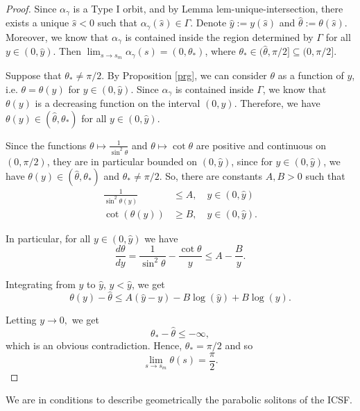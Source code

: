 \documentclass[12pt]{amsart}
\theoremstyle{plain}
\theoremstyle{definition}
\begin{document}
\begin{proof}
    Since $\alpha_\gamma$ is a Type I orbit, and by Lemma {lem-unique-intersection}, there exists a unique $\hat{s} < 0$ such that $\alpha_\gamma(\hat{s}) \in \Gamma$. Denote $\hat{y} := y(\hat{s})$ and $\hat{\theta} := \theta(\hat{s})$. Moreover, we know that  $\alpha_\gamma$ is contained inside the region determined by $\Gamma$ for all $y \in (0, \hat{y})$. Then $\lim_{s \to s_m} \alpha_\gamma(s) = (0, \theta_\ast)$, where $\theta_\ast \in (\hat{\theta}, \pi / 2] \subseteq (0, \pi/2]$.

    Suppose that $\theta_\ast \neq \pi / 2$. By Proposition \ref{prg}, we  can consider $\theta$ as a function of $y$, i.e. $\theta = \theta(y)$ for $y \in (0, \hat{y})$. Since $\alpha_\gamma$ is contained inside $\Gamma$, we know that $\theta(y)$ is a decreasing function on the interval $(0, \hat{y})$. Therefore, we have $\theta(y) \in (\hat{\theta}, \theta_\ast)$ for all $y \in (0,\hat{y})$.

    Since the functions $\theta \mapsto \frac{1}{\sin^2 \theta}$ and $\theta \mapsto \cot\theta$ are positive and continuous on $(0, \pi/2)$, they are in particular bounded on $(0,\hat{y})$, since for $y \in (0, \hat{y})$, we have $\theta(y) \in (\hat{\theta}, \theta_\ast)$ and $\theta_\ast \neq \pi / 2$. So, there are constants $A,B > 0$ such that
    \begin{equation*}
       	\begin{split}
	    \frac{1}{\sin^2 \theta(y)} &\leq A, \quad  y \in (0, \hat{y}) \\
	    \cot(\theta(y)) &\geq B, \quad  y \in (0, \hat{y}).
       	\end{split}
    \end{equation*}

    In particular, for all $y \in (0, \hat{y})$ we have
    $$\frac{d\theta}{dy} = \frac{1}{\sin^2\theta} - \frac{\cot\theta}{y} \leq A - \frac{B}{y}.$$

    Integrating from $y$ to $\hat{y}$, $y < \hat{y}$, we get
    $$\theta(y) - \hat{\theta} \leq A(\hat{y} - y) -B\log(\hat{y}) + B\log(y).$$

    Letting $y \to 0,$ we get $$\theta_\ast - \hat{\theta} \leq - \infty,$$ which is an obvious contradiction. Hence, $\theta_\ast = \pi/2$ and so $$\lim_{s \to s_m} \theta(s) =\frac{ \pi}{2}.$$
\end{proof}


We are in conditions to describe geometrically the parabolic solitons of the ICSF. 
\end{document}

